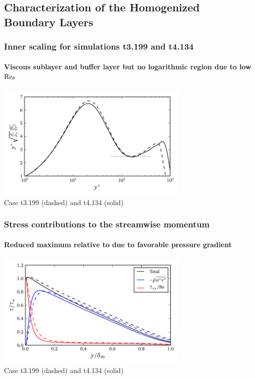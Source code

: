 \documentclass[mathserif]{beamer}
\begin{document}
\subsection{Characterization of the Homogenized Boundary Layers}

\begin{frame}
    \frametitle{Inner scaling for simulations t3.199 and t4.134}
    \framesubtitle{Viscous sublayer and buffer layer but no
                   logarithmic region due to low $\Reynolds[\theta]{}$}
    \begin{center}
        \includegraphics[width=0.7\textwidth]{hqd_inner}
        \\\vspace{-0.75em}
        \small
        Case t3.199 (dashed) and t4.134 (solid)
    \end{center}
\end{frame}

\begin{frame}
    \frametitle{Stress contributions to the streamwise momentum}
    \framesubtitle{Reduced maximum relative to \citet{Topalian2014Temporal} due to favorable pressure gradient}
    \begin{center}
        \includegraphics[width=0.7\textwidth]{hqd_tauxy}
        \\\vspace{-0.75em}
        \small
        Case t3.199 (dashed) and t4.134 (solid)
    \end{center}
\end{frame}
\end{document}
